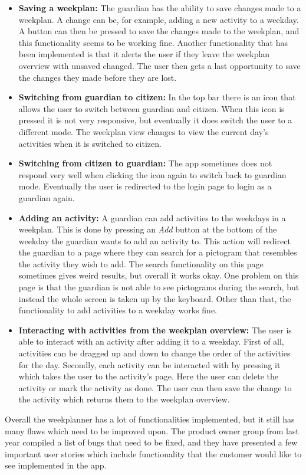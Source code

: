 \begin{itemize}
    \\
    \item \textbf{Saving a weekplan:} The guardian has the ability to save changes made to a weekplan. 
    A change can be, for example, adding a new activity to a weekday.
    A button can then be pressed to save the changes made to the weekplan, and this functionality seems to be working fine.
    Another functionality that has been implemented is that it alerts the user if they leave the weekplan overview with unsaved changed.
    The user then gets a last opportunity to save the changes they made before they are lost.
    \\
    \item \textbf{Switching from guardian to citizen:} In the top bar there is an icon that allows the user to switch between guardian and citizen.
    When this icon is pressed it is not very responsive, but eventually it does switch the user to a different mode.
    The weekplan view changes to view the current day's activities when it is switched to citizen.
    \\
    \item \textbf{Switching from citizen to guardian:} The app sometimes does not respond very well when clicking the icon again to switch back to guardian mode.
    Eventually the user is redirected to the login page to login as a guardian again.
    \\
    \item \textbf{Adding an activity:} A guardian can add activities to the weekdays in a weekplan. 
    This is done by pressing an \textit{Add} button at the bottom of the weekday the guardian wants to add an activity to.
    This action will redirect the guardian to a page where they can search for a pictogram that resembles the activity they wish to add.
    The search functionality on this page sometimes gives weird results, but overall it works okay.
    One problem on this page is that the guardian is not able to see pictograms during the search, but instead the whole screen is taken up by the keyboard.
    Other than that, the functionality to add activities to a weekday works fine.
    \\
    \item \textbf{Interacting with activities from the weekplan overview:}  The user is able to interact with an activity after adding it to a weekday.
    First of all, activities can be dragged up and down to change the order of the activities for the day.
    Secondly, each activity can be interacted with by pressing it which takes the user to the activity's page.
    Here the user can delete the activity or mark the activity as done. 
    The user can then save the change to the activity which returns them to the weekplan overview.
    \\
\end{itemize}
Overall the weekplanner has a lot of functionalities implemented, but it still has many flaws which need to be improved upon.
The product owner group from last year compiled a list of bugs that need to be fixed, and they have presented a few important user stories which include functionality that the customer would like to see implemented in the app.